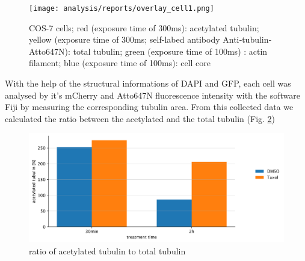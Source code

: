 \begin{figure}[h!]
	\begin{center}
		\begin{minipage}{0,8\textwidth}
			
			\texttt{[image: analysis/reports/overlay\_cell1.png]}
			\caption{COS-7 cells; red (exposure time of 300ms): acetylated tubulin; yellow (exposure time of 300ms; self-labed antibody Anti‐tubulin‐Atto647N): total tubulin; green (exposure time of 100ms) : actin filament; blue (exposure time of 100ms): cell core} 
			\label{whole_cell} 
		\end{minipage}
	\end{center}
\end{figure}

With the help of the structural informations of DAPI and GFP, each cell was analysed by it's mCherry and Atto647N fluorescence intensity with the software Fiji by measuring the corresponding tubulin area. From this collected data we calculated the ratio between the acetylated and the total tubulin (Fig. \ref{acetylated_tubulin})

\begin{figure}[h!]
	\begin{center}
		\begin{minipage}{0,8\textwidth}
			
			\includegraphics[width=\textwidth]{analysis/reports/acetylated_tubulin.png}
			\caption{ratio of acetylated tubulin to total tubulin} 
			\label{acetylated_tubulin} 
		\end{minipage}
	\end{center}
\end{figure}

